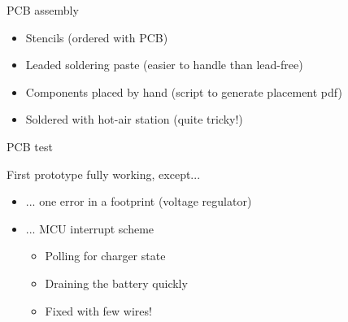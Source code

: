 \documentclass[compress,red]{beamer}
\begin{document}
\begin{frame}{PCB assembly}

  \begin{block}{}
    \begin{itemize}
    \item Stencils (ordered with PCB)
    \item Leaded soldering paste (easier to handle than lead-free)
    \item Components placed by hand (script to generate placement pdf)
    \item Soldered with hot-air station (quite tricky!)
    \end{itemize}
  \end{block}

  \begin{center}
  \end{center}

  \note[item]{}

\end{frame}

\begin{frame}{PCB test}

  \begin{block}{First prototype fully working, except...}
    \begin{itemize}
    \item ... one error in a footprint (voltage regulator)
    \item ... MCU interrupt scheme
      \begin{itemize}
      \item Polling for charger state
      \item Draining the battery quickly
      \item Fixed with few wires!
      \end{itemize}
    \end{itemize}
  \end{block}

  \begin{center}
  \end{center}

  \note[item]{}

\end{frame}
\end{document}
